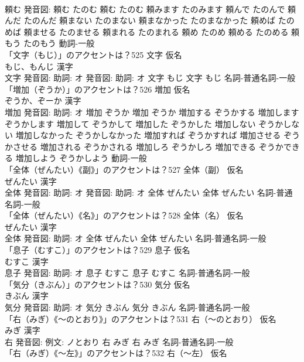 \documentclass[8pt]{extreport}
\begin{document}
\begin{CJK}{UTF8}{min}
\\	頼む 発音図:	頼む たのむ		頼む たのむ 頼みます たのみます 頼んで たのんで 頼んだ たのんだ 頼まない たのまない 頼まなかった たのまなかった 頼めば たのめば 頼ませる たのませる 頼まれる たのまれる 頼め たのめ 頼める たのめる 頼もう たのもう				動詞-一般 
\\	「文字（もじ）」のアクセントは？525	文字 仮名　
\\	もじ、もんじ 漢字　
\\	文字 発音図: 助詞: オ 発音図: 助詞: オ	文字 もじ		文字 もじ				名詞-普通名詞-一般 
\\	「増加（ぞうか）」のアクセントは？526	増加 仮名　
\\	ぞうか、ぞーか 漢字　
\\	増加 発音図: 助詞: オ	増加 ぞうか		増加 ぞうか 増加する ぞうかする 増加します ぞうかします 増加して ぞうかして 増加した ぞうかした 増加しない ぞうかしない 増加しなかった ぞうかしなかった 増加すれば ぞうかすれば 増加させる ぞうかさせる 増加される ぞうかされる 増加しろ ぞうかしろ 増加できる ぞうかできる 増加しよう ぞうかしよう				動詞-一般 
\\	「全体（ぜんたい）《副》」のアクセントは？527	全体（副） 仮名　
\\	ぜんたい 漢字　
\\	全体 発音図: 助詞: オ 発音図: 助詞: オ	全体 ぜんたい		全体 ぜんたい				名詞-普通名詞-一般 
\\	「全体（ぜんたい）《名》」のアクセントは？528	全体（名） 仮名　
\\	ぜんたい 漢字　
\\	全体 発音図: 助詞: オ	全体 ぜんたい		全体 ぜんたい				名詞-普通名詞-一般 
\\	「息子（むすこ）」のアクセントは？529	息子 仮名　
\\	むすこ 漢字　
\\	息子 発音図: 助詞: オ	息子 むすこ		息子 むすこ				名詞-普通名詞-一般 
\\	「気分（きぶん）」のアクセントは？530	気分 仮名　
\\	きぶん 漢字　
\\	気分 発音図: 助詞: オ	気分 きぶん		気分 きぶん				名詞-普通名詞-一般 
\\	「右（みぎ）《〜のとおり》」のアクセントは？531	右（〜のとおり） 仮名　
\\	みぎ 漢字　
\\	右 発音図: 例文: ノとおり	右 みぎ		右 みぎ				名詞-普通名詞-一般 
\\	「右（みぎ）《〜左》」のアクセントは？532	右（〜左） 仮名　

\end{CJK}
\end{document}
